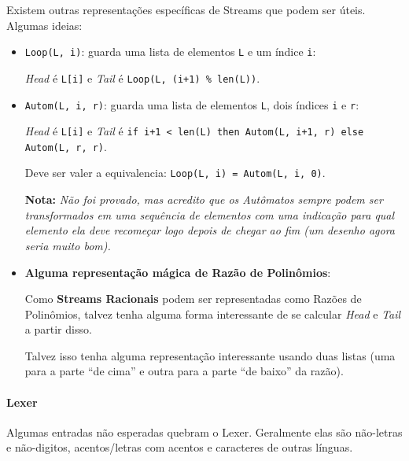 \documentclass{article}
\newcommand{\Head}{\emph{Head}}
\newcommand{\Tail}{\emph{Tail}}
\newcommand{\note}[1]{\textbf{Nota:} \textit{#1}}
\begin{document}
Existem outras representações específicas de Streams
que podem ser úteis.
Algumas ideias:
\begin{itemize}
    \item \texttt{Loop(L, i)}:
        guarda uma lista de elementos \texttt{L} e
        um índice \texttt{i}: \par
        \Head{} é \texttt{L[i]} e
        \Tail{} é \texttt{Loop(L, (i+1) \% len(L))}.
    \item \texttt{Autom(L, i, r)}:
        guarda uma lista de elementos \texttt{L},
        dois índices \texttt{i} e \texttt{r}: \par
        \Head{} é \texttt{L[i]} e
        \Tail{} é \texttt{if i+1 < len(L)
            then
                Autom(L, i+1, r)
            else
                Autom(L, r, r)}.

        Deve ser valer a equivalencia:
        \texttt{Loop(L, i) = Autom(L, i, 0)}.

        \note{Não foi provado,
        mas acredito que os Autômatos
        sempre podem ser transformados
        em uma sequência de elementos
        com uma indicação para qual elemento
        ela deve recomeçar logo depois de chegar ao fim
        (um desenho agora seria muito bom).}
    \item \textbf{Alguma representação mágica de Razão de Polinômios}:
        \par Como \textbf{Streams Racionais} podem ser
        representadas como Razões de Polinômios,
        talvez tenha alguma forma interessante de
        se calcular \Head{} e \Tail{} a partir disso.

        Talvez isso tenha alguma representação interessante
        usando duas listas
        (uma para a parte ``de cima'' e
        outra para a parte ``de baixo'' da razão).
\end{itemize}

\paragraph{Lexer}

Algumas entradas não esperadas quebram o Lexer.
Geralmente elas são não-letras e não-digitos,
acentos/letras com acentos e caracteres de outras línguas.

\newpage
\nocite{*}


\end{document}

